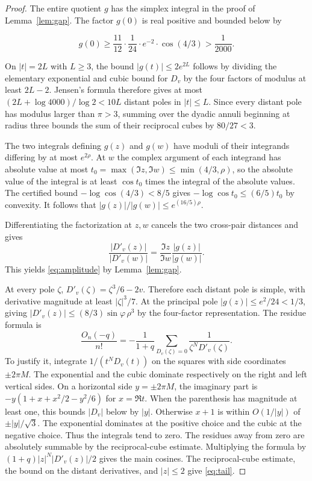 \documentclass[11pt]{article}
\begin{document}
\begin{proof}

The entire quotient $g$ has the simplex integral in the proof of Lemma~\ref{lem:gap}. The factor $g(0)$ is real positive and bounded below by

\begin{equation*}
g(0)\ge\frac{11}{12}\cdot\frac1{24}\cdot e^{-2}\cdot \cos(4/3) >\frac1{2000}.
\end{equation*}

On $|t|=2L$ with $L\ge3$, the bound $|g(t)|\le2e^{2L}$ follows by dividing the elementary exponential and cubic bound for $D_v$ by the four factors of modulus at least $2L-2$. Jensen's formula therefore gives at most $(2L+\log4000)/\log 2<10L$ distant poles in $|t|\le L$. Since every distant pole has modulus larger than $\pi>3$, summing over the dyadic annuli beginning at radius three bounds the sum of their reciprocal cubes by $80/27<3$.

The two integrals defining $g(z)$ and $g(w)$ have moduli of their integrands differing by at most $e^{2\rho}$. At $w$ the complex argument of each integrand has absolute value at most $t_0=\max(\Im z,\Im w)\le\min(4/3,\rho)$, so the absolute value of the integral is at least $\cos t_0$ times the integral of the absolute values. The certified bound $-\log\cos(4/3)<8/5$ gives $-\log\cos t_0\le (6/5)t_0$ by convexity. It follows that $|g(z)|/|g(w)|\le e^{(16/5)\rho}$.

Differentiating the factorization at \(z,w\) cancels the two cross-pair distances and gives
\[
\frac{|D'_v(z)|}{|D'_v(w)|}=\frac{\Im z}{\Im w}\frac{|g(z)|}{|g(w)|}.
\]
This yields \eqref{eq:amplitude} by Lemma~\ref{lem:gap}.

At every pole \(\zeta\), \(D'_v(\zeta)=\zeta^3/6-2v\). Therefore each distant pole is simple, with derivative magnitude at least \(|\zeta|^3/7\). At the principal pole \(|g(z)|\le e^2/24<1/3\), giving \(|D'_v(z)|\le(8/3)\sin\varphi\,\rho^3\) by the four-factor representation. The residue formula is
\[
\frac{O_n(-q)}{n!}=-\frac1{1+q}\sum_{D_v(\zeta)=0}
       \frac{1}{\zeta^{N} D'_v(\zeta)}.
\]
To justify it, integrate \(1/(t^N D_v(t))\) on the squares with side coordinates \(\pm2\pi M\). The exponential and the cubic dominate respectively on the right and left vertical sides. On a horizontal side \(y=\pm2\pi M\), the imaginary part is \(-y(1+x+x^2/2-y^2/6)\) for \(x=\Re t\). When the parenthesis has magnitude at least one, this bounds \(|D_v|\) below by \(|y|\). Otherwise \(x+1\) is within \(O(1/|y|)\) of \(\pm |y|/\sqrt3\). The exponential dominates at the positive choice and the cubic at the negative choice. Thus the integrals tend to zero. The residues away from zero are absolutely summable by the reciprocal-cube estimate. Multiplying the formula by \((1+q)|z|^N|D'_v(z)|/2\) gives the main cosines. The reciprocal-cube estimate, the bound on the distant derivatives, and \(|z|\le2\) give \eqref{eq:tail}.

\end{proof}
\end{document}
